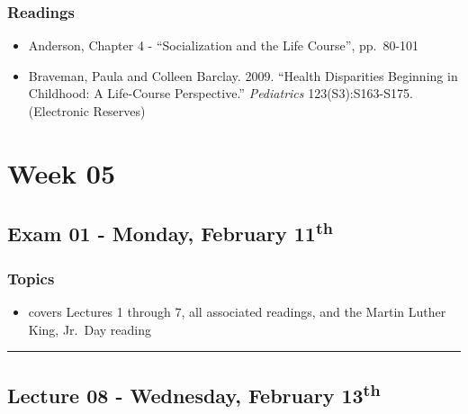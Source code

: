 \documentclass[]{book}
\providecommand{\tightlist}{%
  \setlength{\itemsep}{0pt}\setlength{\parskip}{0pt}}
\begin{document}
\hypertarget{readings-7}{%
\subsubsection*{Readings}\label{readings-7}}

\begin{itemize}
\tightlist
\item
  Anderson, Chapter 4 - ``Socialization and the Life Course'', pp.~80-101
\item
  Braveman, Paula and Colleen Barclay. 2009. ``Health Disparities Beginning in Childhood: A Life-Course Perspective.'' \emph{Pediatrics} 123(S3):S163-S175. (Electronic Reserves)
\end{itemize}

\hypertarget{week-05}{%
\section*{Week 05}\label{week-05}}

\hypertarget{exam-01---monday-february-11th}{%
\subsection*{\texorpdfstring{Exam 01 - Monday, February 11\textsuperscript{th}}{Exam 01 - Monday, February 11th}}\label{exam-01---monday-february-11th}}

\hypertarget{topics-8}{%
\subsubsection*{Topics}\label{topics-8}}

\begin{itemize}
\tightlist
\item
  covers Lectures 1 through 7, all associated readings, and the Martin Luther King, Jr.~Day reading
\end{itemize}

\begin{center}\rule{0.5\linewidth}{\linethickness}\end{center}

\hypertarget{lecture-08---wednesday-february-13th}{%
\subsection*{\texorpdfstring{Lecture 08 - Wednesday, February 13\textsuperscript{th}}{Lecture 08 - Wednesday, February 13th}}\label{lecture-08---wednesday-february-13th}}
\end{document}
